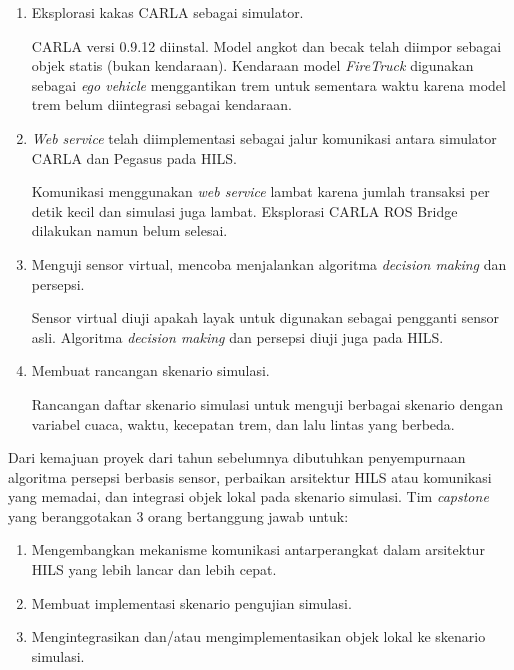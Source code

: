 \begin{enumerate}

	\item Eksplorasi kakas CARLA sebagai simulator.

	CARLA versi 0.9.12 diinstal. Model angkot dan becak telah diimpor
	sebagai objek statis (bukan kendaraan). Kendaraan model \textit{FireTruck}
	digunakan sebagai \textit{ego vehicle} menggantikan trem untuk sementara
	waktu karena model trem belum diintegrasi sebagai kendaraan.

	\item \textit{Web service} telah diimplementasi sebagai jalur komunikasi
	antara simulator CARLA dan Pegasus pada HILS.

	Komunikasi menggunakan \textit{web service} lambat karena jumlah transaksi
	per detik kecil dan simulasi juga lambat. Eksplorasi CARLA ROS Bridge
	dilakukan namun belum selesai.

	\item Menguji sensor virtual, mencoba menjalankan algoritma \textit{decision
	making} dan persepsi.

	Sensor virtual diuji apakah layak untuk digunakan sebagai pengganti sensor
	asli. Algoritma \textit{decision making} dan persepsi diuji juga pada HILS.

	\item Membuat rancangan skenario simulasi.

	Rancangan daftar skenario simulasi untuk menguji berbagai skenario dengan
	variabel cuaca, waktu, kecepatan trem, dan lalu lintas yang berbeda.

\end{enumerate}

Dari kemajuan proyek dari tahun sebelumnya dibutuhkan  penyempurnaan algoritma
persepsi berbasis sensor, perbaikan arsitektur HILS atau komunikasi yang
memadai, dan integrasi objek lokal pada skenario simulasi. Tim \textit{capstone}
yang beranggotakan 3 orang bertanggung jawab untuk:

\begin{enumerate}

	\item Mengembangkan mekanisme komunikasi antarperangkat dalam arsitektur
	HILS yang lebih lancar dan lebih cepat.
	\item Membuat implementasi skenario pengujian simulasi.
	\item Mengintegrasikan dan/atau mengimplementasikan objek lokal ke skenario
	simulasi.

\end{enumerate}

